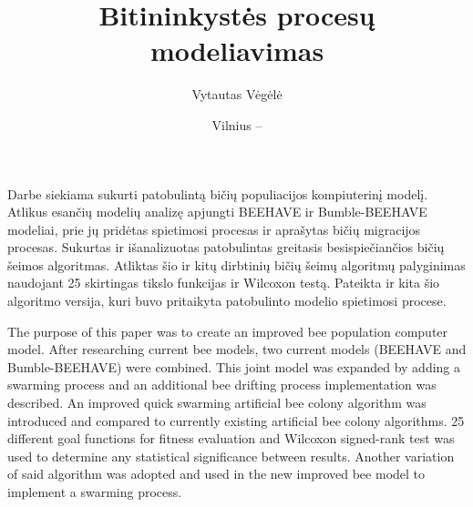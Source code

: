 \documentclass{VUMIFKompMagistrinis}
\title{Bitininkystės procesų modeliavimas}
\author{Vytautas Vėgėlė}
\date{Vilnius -- \the\year}
\begin{document}
\maketitle

\tableofcontents


Darbe siekiama sukurti patobulintą bičių populiacijos kompiuterinį modelį. Atlikus esančių modelių analizę apjungti BEEHAVE ir Bumble-BEEHAVE modeliai, prie jų pridėtas spietimosi procesas ir aprašytas bičių migracijos procesas. Sukurtas ir išanalizuotas patobulintas greitasis besispiečiančios bičių šeimos algoritmas. Atliktas šio ir kitų dirbtinių bičių šeimų algoritmų palyginimas naudojant 25 skirtingas tikslo funkcijas ir Wilcoxon testą. Pateikta ir kita šio algoritmo versija, kuri buvo pritaikyta patobulinto modelio spietimosi procese.

The purpose of this paper was to create an improved bee population computer model. After researching current bee models, two current models (BEEHAVE and Bumble-BEEHAVE) were combined. This joint model was expanded by adding a swarming process and an additional bee drifting process implementation was described. An improved quick swarming artificial bee colony algorithm was introduced and compared to currently existing artificial bee colony algorithms. 25 different goal functions for fitness evaluation and Wilcoxon signed-rank test was used to determine any statistical significance between results. Another variation of said algorithm was adopted and used in the new improved bee model to implement a swarming process.
\end{document}
